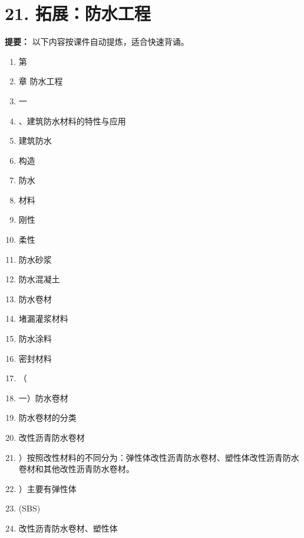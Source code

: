 \documentclass[UTF8,fontset=fandol,11pt]{ctexart}
\begin{document}
\newpage

\section*{21. 拓展：防水工程}


\begin{mainbox}

\textbf{提要：} 以下内容按课件自动提炼，适合快速背诵。

\end{mainbox}

\begin{enumerate}[label=\arabic*.]

\item 第

\item 章 防水工程

\item 一

\item 、建筑防水材料的特性与应用

\item 建筑防水

\item 构造

\item 防水

\item 材料

\item 刚性

\item 柔性

\item 防水砂浆

\item 防水混凝土

\item 防水卷材

\item 堵漏灌浆材料

\item 防水涂料

\item 密封材料

\item （

\item 一）防水卷材

\item 防水卷材的分类

\item 改性沥青防水卷材

\item ）按照改性材料的不同分为：弹性体改性沥青防水卷材、塑性体改性沥青防水卷材和其他改性沥青防水卷材。

\item ）主要有弹性体

\item (SBS)

\item 改性沥青防水卷材、塑性体

\end{enumerate}
\end{document}
